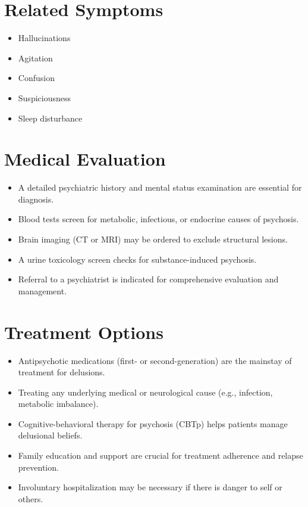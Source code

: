 \section*{Related Symptoms}
\begin{itemize}
  \item Hallucinations
  \item Agitation
  \item Confusion
  \item Suspiciousness
  \item Sleep disturbance
\end{itemize}

\section*{Medical Evaluation}
\begin{itemize}
  \item A detailed psychiatric history and mental status examination are essential for diagnosis.
  \item Blood tests screen for metabolic, infectious, or endocrine causes of psychosis.
  \item Brain imaging (CT or MRI) may be ordered to exclude structural lesions.
  \item A urine toxicology screen checks for substance-induced psychosis.
  \item Referral to a psychiatrist is indicated for comprehensive evaluation and management.
\end{itemize}

\section*{Treatment Options}
\begin{itemize}
  \item Antipsychotic medications (first- or second-generation) are the mainstay of treatment for delusions.
  \item Treating any underlying medical or neurological cause (e.g., infection, metabolic imbalance).
  \item Cognitive-behavioral therapy for psychosis (CBTp) helps patients manage delusional beliefs.
  \item Family education and support are crucial for treatment adherence and relapse prevention.
  \item Involuntary hospitalization may be necessary if there is danger to self or others.
\end{itemize}

